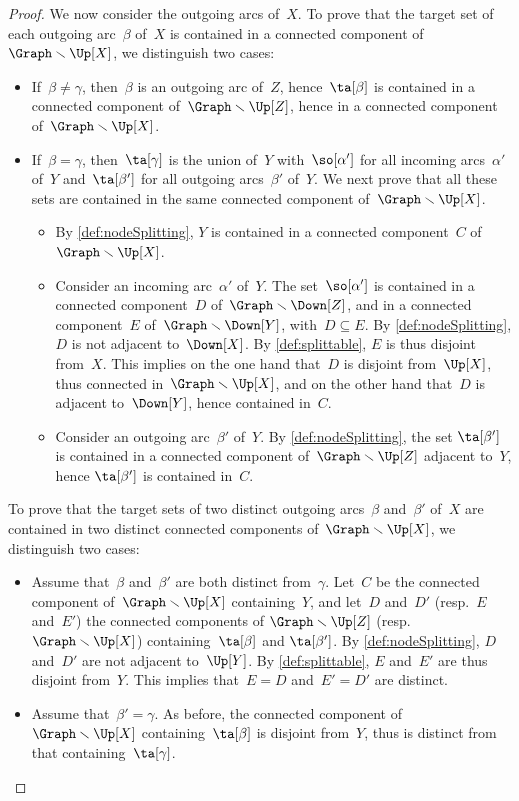 \documentclass{amsart}
\theoremstyle{definition}
\newcommand{\ssm}{\smallsetminus} %
\begin{document}
\begin{proof}
  We now consider the outgoing arcs of~$X$.
  To prove that the target set of each outgoing arc~$\beta$ of~$X$ is contained in a connected component of~$\Graph \ssm \Up[X]$, we distinguish two cases:
  \begin{itemize}
    \item If~$\beta \ne \gamma$, then~$\beta$ is an outgoing arc of~$Z$, hence~$\ta[\beta]$ is contained in a connected component of~$\Graph \ssm \Up[Z]$, hence in a connected component of~$\Graph \ssm \Up[X]$.
    \item If~$\beta = \gamma$, then~$\ta[\gamma]$ is the union of~$Y$ with~$\so[\alpha']$ for all incoming arcs~$\alpha'$ of~$Y$ and~$\ta[\beta']$ for all outgoing arcs~$\beta'$ of~$Y$. We next prove that all these sets are contained in the same connected component of~$\Graph \ssm \Up[X]$.
    \begin{itemize}
      \item By \cref{def:nodeSplitting}, $Y$ is contained in a connected component~$C$ of~$\Graph \ssm \Up[X]$. 
      \item Consider an incoming arc~$\alpha'$ of~$Y$. The set~$\so[\alpha']$ is contained in a connected component~$D$ of~$\Graph \ssm \Down[Z]$, and in a connected component~$E$ of~$\Graph \ssm \Down[Y]$, with~$D \subseteq E$. By \cref{def:nodeSplitting}, $D$ is not adjacent to~$\Down[X]$. By \cref{def:splittable}, $E$ is thus disjoint from~$X$. This implies on the one hand that~$D$ is disjoint from~$\Up[X]$, thus connected in~$\Graph \ssm \Up[X]$, and on the other hand that~$D$ is adjacent to~$\Down[Y]$, hence contained in~$C$. 
      \item Consider an outgoing arc~$\beta'$ of~$Y$. By \cref{def:nodeSplitting}, the set $\ta[\beta']$ is contained in a connected component of~$\Graph \ssm \Up[Z]$ adjacent to~$Y$, hence $\ta[\beta']$ is contained in~$C$.
    \end{itemize}
  \end{itemize}
  To prove that the target sets of two distinct outgoing arcs~$\beta$ and~$\beta'$ of~$X$ are contained in two distinct connected components of~$\Graph \ssm \Up[X]$, we distinguish two cases:
  \begin{itemize}
  \item Assume that~$\beta$ and~$\beta'$ are both distinct from~$\gamma$. Let~$C$ be the connected component of~$\Graph \ssm \Up[X]$ containing~$Y$, and let~$D$ and~$D'$ (resp.~$E$ and~$E'$) the connected components of $\Graph \ssm \Up[Z]$ (resp.~$\Graph \ssm \Up[X]$) containing~$\ta[\beta]$ and $\ta[\beta']$. By \cref{def:nodeSplitting}, $D$ and~$D'$ are not adjacent to~$\Up[Y]$. By \cref{def:splittable}, $E$ and~$E'$ are thus disjoint from~$Y$. This implies that~$E = D$ and~$E' = D'$ are distinct.
  \item Assume that~$\beta' = \gamma$. As before, the connected component of~$\Graph \ssm \Up[X]$ containing~$\ta[\beta]$ is disjoint from~$Y$, thus is distinct from that containing~$\ta[\gamma]$.
  \qedhere
  \end{itemize}
\end{proof}
\end{document}

